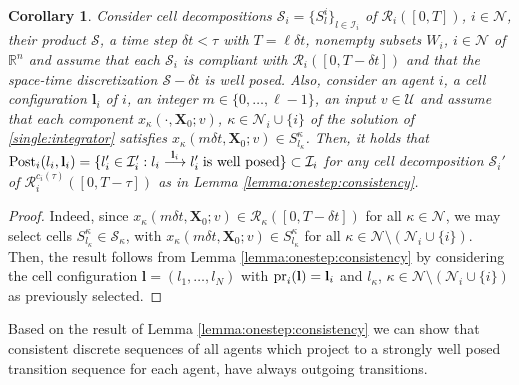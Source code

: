 \documentclass[reqno]{amsart}
\theoremstyle{plain}
\newtheorem{corollary}[thm]{Corollary}
\theoremstyle{definition}
\numberwithin{equation}{section}
\begin{document}
\begin{corollary} \label{corollary:individual:post}
Consider cell decompositions ${\ensuremath{\mathcal{S}}}_i=\{S_l^i\}_{l\in{\ensuremath{\mathcal{I}}}_i}$ of ${\ensuremath{\mathcal{R}}}_i([0,T])$, $i\in{\ensuremath{\mathcal{N}}}$, their product ${\ensuremath{\mathcal{S}}}$, a time step $\delta t<\tau$ with $T=\ell\delta t$, nonempty subsets $W_i$, $i\in{\ensuremath{\mathcal{N}}}$ of ${\ensuremath{\mathbb{R}^{{n}}}}$ and assume that each ${\ensuremath{\mathcal{S}}}_i$ is compliant with  ${\ensuremath{\mathcal{R}}}_i([0,T-\delta t])$ and that the space-time discretization ${\ensuremath{\mathcal{S}}}-\delta t$ is well posed. Also, consider an agent $i$, a cell configuration ${\textbf{{l}}}_i$ of $i$, an integer $m\in\{0,\ldots,\ell-1\}$, an input $v\in{\ensuremath{\mathcal{U}}}$ and assume that each component $x_{\kappa}(\cdot,{\textbf{{X}}}_0;v)$, $\kappa\in{\ensuremath{\mathcal{N}}}_i\cup\{i\}$ of the solution of \eqref{single:integrator} satisfies $x_{\kappa}(m\delta t,{\textbf{{X}}}_0;v)\in S_{l_{\kappa}}^{\kappa}$. 
Then, it holds that ${\rm Post}_i(l_i,{\textbf{{l}}}_i)=\{l_i'\in{\ensuremath{\mathcal{I}}}_i':l_i\overset{{\textbf{{l}}}_i}{\longrightarrow}l_i'\;\textup{is well posed}\}\subset{\ensuremath{\mathcal{I}}}_i$ for any cell decomposition ${\ensuremath{\mathcal{S}}}_i'$ of ${\ensuremath{\mathcal{R}}}_i^{c_i(\tau)}([0,T-\tau])$ as in Lemma \ref{lemma:onestep:consistency}.
\end{corollary}

\begin{proof}
Indeed, since $x_{\kappa}(m\delta t,{\textbf{{X}}}_0;v)\in {\ensuremath{\mathcal{R}}}_{\kappa}([0,T-\delta t])$ for all $\kappa\in{\ensuremath{\mathcal{N}}}$, we may select cells $S_{l_{\kappa}}^{\kappa}\in{\ensuremath{\mathcal{S}}}_{\kappa}$, with  $x_{\kappa}(m\delta t,{\textbf{{X}}}_0;v)\in S_{l_{\kappa}}^{\kappa}$ for all $\kappa\in{\ensuremath{\mathcal{N}}}\setminus({\ensuremath{\mathcal{N}}}_i\cup\{i\})$. Then, the result follows from Lemma \ref{lemma:onestep:consistency} by considering the cell configuration ${\textbf{{l}}}=(l_1,\ldots,l_N)$ with ${\rm pr}_i({\textbf{{l}}})={\textbf{{l}}}_i$ and $l_{\kappa}$,  $\kappa\in{\ensuremath{\mathcal{N}}}\setminus({\ensuremath{\mathcal{N}}}_i\cup\{i\})$ as previously selected.
\end{proof}

\noindent Based on the result of Lemma \ref{lemma:onestep:consistency} we can show that consistent discrete sequences of all agents which project to a strongly well posed transition sequence for each agent, have always outgoing transitions. 
\end{document}
